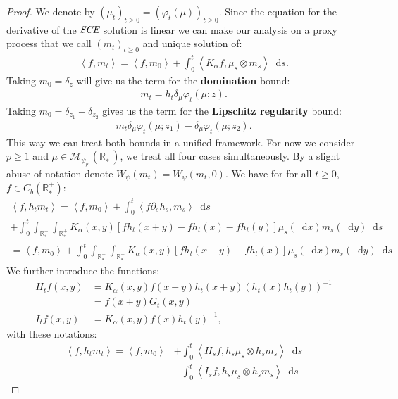 \documentclass[11pt,a4paper]{article}
\newcommand{\RRP}{\mathbb{R}^+_*}
\newcommand{\MC}{\mathcal{M}}
\newcommand{\SCE}{\emph{SCE}}
\newcommand{\Proc}[1]{\left(#1\right)_{t\geq 0}}
\newcommand{\brac}[1]{\left\langle#1\right\rangle}
\newcommand{\dd}{\mathop{}\!\mathrm{d}}
\begin{document}
\begin{proof}
    We denote by $\Proc{\mu_t} = \Proc{\varphi_t(\mu)}$. Since the equation for the derivative of the $\SCE$  solution is linear we can make our analysis on a proxy process that we call $\Proc{m_t}$ and unique solution of:
    \begin{align*}
        \brac{f,m_t} = \brac{f,m_0} + \int_0^t \brac{K_\alpha f,\mu_s\otimes m_s} \dd s.
    \end{align*}
    Taking $m_0 = \delta_z$ will give us the term for the \textbf{domination} bound:
    \begin{align*}
        m_t = h_t\delta_\mu \varphi_t(\mu;z).
    \end{align*}
    Taking $m_0 = \delta_{z_1} - \delta_{z_2}$ gives us the term for the \textbf{Lipschitz regularity} bound: 
    \begin{align*}
        m_t \delta_\mu \varphi_t(\mu;z_1) - \delta_\mu \varphi_t(\mu;z_2).
    \end{align*}
    This way we can treat both bounds in a unified framework. For now we consider $p \geq 1$ and $\mu \in \MC_{\psi_{p'}}(\RRP)$, we treat all four cases simultaneously.
    By a slight abuse of notation denote $W_{\psi}(m_t) = W_{\psi}(m_t,0)$. We have for for all $t\geq 0$, $f \in C_b(\RRP)$:
    \begin{multline*}
        \brac{f,h_tm_t} = \brac{f,m_0} + \int_0^t \brac{f \partial_s h_s,m_s} \dd s \\
        + \int_0^t \int_{\RRP}\int_{\RRP}K_\alpha(x,y) \left[fh_t(x+y) - fh_t(x) - fh_t(y) \right] \mu_s(\dd x) m_s(\dd y) \dd s \\
        = \brac{f,m_0} + \int_0^t \int_{\RRP}\int_{\RRP}K_\alpha(x,y) \left[fh_t(x+y) - fh_t(x)\right] \mu_s(\dd x) m_s(\dd y) \dd s
    \end{multline*}
    We further introduce the functions:
    \begin{align*}
        H_tf(x,y) &= K_\alpha(x,y) f(x+y) h_t(x+y)\left(h_t(x)h_t(y)\right)^{-1} \\
        &= f(x+y) G_t(x,y)\\
        I_tf(x,y) &= K_\alpha(x,y)f(x) h_t(y)^{-1},
    \end{align*}
    with these notations:
    \begin{subequations}
    \begin{align}
        \brac{f,h_tm_t} = \brac{f,m_0} &+ \int_0^t \brac{H_sf,h_s\mu_s \otimes h_s m_s} \dd s\label{proof:eq:wass-rescaled-SCE-1}\\
        &-\int_0^t \brac{I_sf,h_s\mu_s \otimes h_s m_s} \dd s\label{proof:eq:wass-rescaled-SCE-2}
    \end{align}
    \label{proof:eq:wass-rescaled-SCE}
    \end{subequations}


\end{proof}
\end{document}
